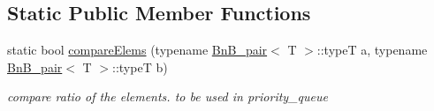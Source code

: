 \subsection*{Static Public Member Functions}
\begin{DoxyCompactItemize}
\item 
\hypertarget{class_bn_b___u_p_a17570dfb1185be4ab8d1e651b7064ea5}{}static bool \hyperlink{class_bn_b___u_p_a17570dfb1185be4ab8d1e651b7064ea5}{compare\+Elems} (typename \hyperlink{struct_bn_b__pair}{Bn\+B\+\_\+pair}$<$ T $>$\+::type\+T a, typename \hyperlink{struct_bn_b__pair}{Bn\+B\+\_\+pair}$<$ T $>$\+::type\+T b)\label{class_bn_b___u_p_a17570dfb1185be4ab8d1e651b7064ea5}

\begin{DoxyCompactList}\small\item\em compare ratio of the elements. to be used in priority\+\_\+queue \end{DoxyCompactList}\end{DoxyCompactItemize}
